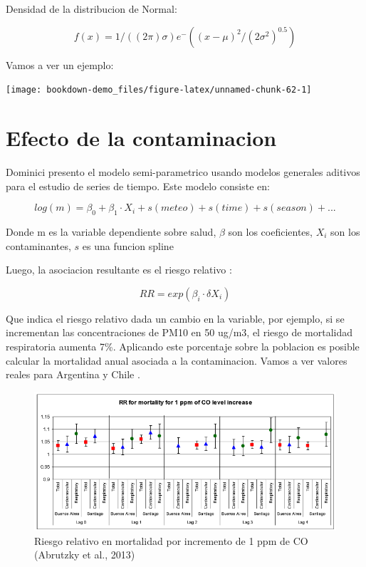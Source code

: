 \documentclass[]{book}
\begin{document}
Densidad de la distribucion de Normal:

\begin{equation}
f(x) = 1/( (2 \pi) \sigma) e^-((x - \mu)^2/(2 \sigma^2)^0.5 )
\label{eq:13}
\end{equation}

Vamos a ver un ejemplo:

\texttt{[image: bookdown-demo\_files/figure-latex/unnamed-chunk-62-1]}

\hypertarget{efecto-de-la-contaminacion}{%
\section{Efecto de la contaminacion}\label{efecto-de-la-contaminacion}}

Dominici presento el modelo semi-parametrico usando modelos generales aditivos \citep{gam} para el estudio de series de tiempo. Este modelo consiste en:

\begin{equation}
log(m) = \beta_0 + \beta_1 \cdot X_i + s(meteo) + s(time) + s(season) + ...
\label{eq:13}
\end{equation}

Donde m es la variable dependiente sobre salud, \(\beta\) son los coeficientes, \(X_i\) son los contaminantes, \(s\) es una funcion spline

Luego, la asociacion resultante es el riesgo relativo \citep{rosana}:

\begin{equation}
RR = exp(\beta_i \cdot \delta X_i)
\label{eq:13}
\end{equation}

Que indica el riesgo relativo dada un cambio en la variable, por ejemplo, si se incrementan las concentraciones de PM10 en 50 ug/m3, el riesgo de mortalidad respiratoria aumenta 7\%. Aplicando este porcentaje sobre la poblacion es posible calcular la mortalidad anual asociada a la contaminacion. Vamos a ver valores reales para Argentina y Chile \citep{rosana}.

\begin{figure}
\includegraphics[width=11.44in,height=1.8\textheight]{figs/rosana1} \caption{Riesgo relativo en mortalidad por incremento de 1 ppm de CO (Abrutzky et al., 2013)}\label{fig:unnamed-chunk-63}
\end{figure}
\end{document}
